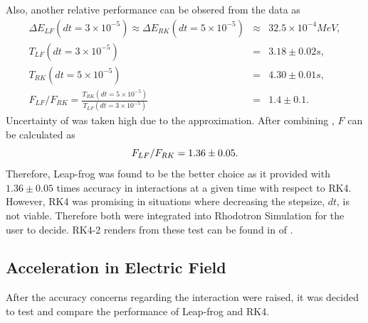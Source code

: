 \documentclass[a4paper,oneside,12pt]{report}
\numberwithin{equation}{chapter}
\begin{document}
{\vspace{-15pt}
Also, another relative performance can be obsered from the data as
\vspace{-20pt}\begin{eqnarray} \label{eq:f_lf_rk_mag_2}
    \Delta E_{LF} (dt=3 \times 10^{-5}) \approx \Delta E_{RK} (dt=5 \times 10^{-5}) &\approx& 32.5 \times 10^{-4} MeV, \\
    T_{LF}(dt=3 \times 10^{-5})  &=& 3.18 \pm 0.02 s, \\ %
    T_{RK}(dt=5 \times 10^{-5})  &=& 4.30 \pm 0.01 s, \\ %
    F_{LF}/F_{RK} = \frac{T_{RK}(dt=5 \times 10^{-5})}{T_{LF}(dt=3 \times 10^{-5})} &=& 1.4 \pm 0.1.
\end{eqnarray}
\clearpage
Uncertainty of  was taken high due to the approximation. 
After combining , $F$ can be calculated as
\vspace{-20pt}\begin{equation}
    F_{LF}/F_{RK} = 1.36 \pm 0.05.
\vspace{-20pt}\end{equation}
Therefore, Leap-frog was found to be the better choice as it provided with $1.36 \pm 0.05$ times accuracy in \eB interactions at a given time with respect to RK4. However,
RK4 was promising in situations where decreasing the stepsize, $dt$, is not viable. Therefore both were integrated into Rhodotron Simulation for the user to decide.
RK4-2 renders from these test can be found in  of .

\subsection{Acceleration in Electric Field}
After the accuracy concerns regarding the \eB interaction were raised, it was decided to test \eE and compare the performance of Leap-frog and RK4.

}
\end{document}
